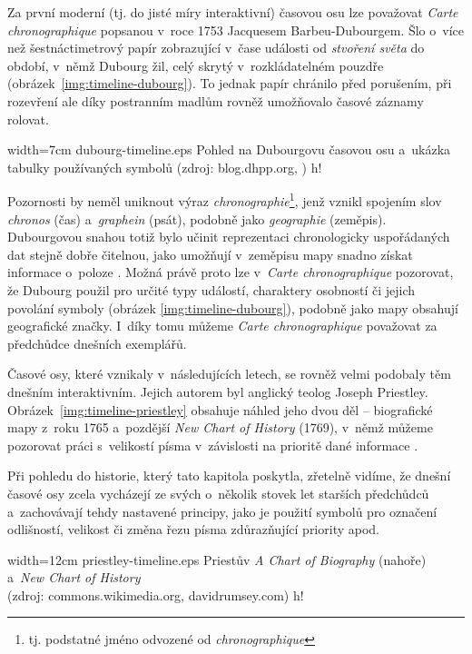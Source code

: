 		Za první moderní (tj. do jisté míry interaktivní) časovou osu lze považovat \emph{Carte chronographique} popsanou v~roce 1753 Jacquesem Barbeu-Dubourgem. Šlo o~více než šestnáctimetrový papír zobrazující v~čase události od \emph{stvoření světa} do období, v~němž Dubourg žil, celý skrytý v~rozkládatelném pouzdře (obrázek~\ref{img:timeline-dubourg}). To jednak papír chránilo před porušením, při rozevření ale díky postranním madlům rovněž umožňovalo časové záznamy rolovat.
					
		  {width=7cm}
		  {dubourg-timeline.eps}
		  {Pohled na Dubourgovu časovou osu a~ukázka tabulky používaných symbolů
		  (zdroj: blog.dhpp.org, \cite{ferguson-1991})}
		  {h!}
		
		Pozornosti by neměl uniknout výraz \emph{chronographie}\footnote{tj. podstatné jméno odvozené od \emph{chronographique}}, jenž vznikl spojením slov \emph{chronos} (čas) a~\emph{graphein} (psát), podobně jako \emph{geographie} (zeměpis). Dubourgovou snahou totiž bylo učinit reprezentaci chronologicky uspořádaných dat stejně dobře čitelnou, jako umožňují v~zeměpisu mapy snadno získat informace o~poloze \cite{ferguson-1991}. Možná právě proto lze v~\emph{Carte chronographique} pozorovat, že Dubourg použil pro určité typy událostí, charaktery osobností či jejich povolání symboly (obrázek \ref{img:timeline-dubourg}), podobně jako mapy obsahují geografické značky. I~díky tomu můžeme \emph{Carte chronographique} považovat za předchůdce dnešních exemplářů.
		
		Časové osy, které vznikaly v~následujících letech, se rovněž velmi podobaly těm dnešním interaktivním. Jejich autorem byl anglický teolog Joseph Priestley. Obrá\-zek~\ref{img:timeline-priestley} obsahuje náhled jeho dvou děl -- biografické mapy z~roku 1765 a~pozdější \emph{New Chart of History} (1769), v~němž můžeme pozorovat práci s~velikostí písma v~závislosti na prioritě dané informace \cite{trettien-2009}. 

		Při pohledu do historie, který tato kapitola poskytla, zřetelně vidíme, že dnešní časové osy zcela vycházejí ze svých o~několik stovek let starších předchůdců a~zachovávají tehdy nastavené principy, jako je použití symbolů pro označení odlišností, velikost či změna řezu písma zdůrazňující priority apod. 

		  {width=12cm}
		  {priestley-timeline.eps}
		  {Priestův \emph{A Chart of Biography} (nahoře) a~\emph{New Chart of History}\\(zdroj: \mbox{commons.wikimedia.org}, davidrumsey.com)}
		  {h!}
		
